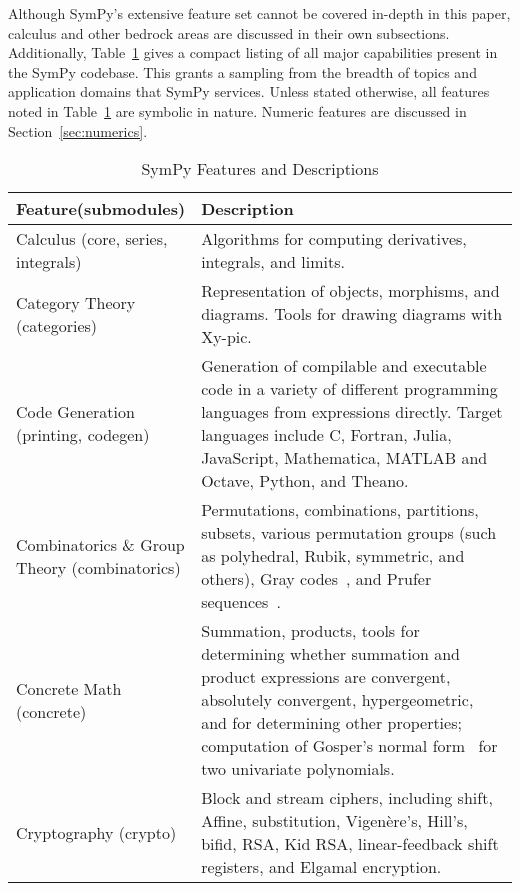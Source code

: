 
Although SymPy's extensive feature set cannot be covered in-depth in this paper,
calculus and other bedrock areas are discussed in their own subsections.
Additionally,
Table~\ref{features-table} gives a compact listing of all major capabilities
present in the SymPy codebase. This grants a sampling from the breadth of
topics and application domains that SymPy services. Unless stated otherwise,
all features noted in Table~\ref{features-table} are symbolic in nature.
Numeric features are discussed in Section~\ref{sec:numerics}.

\begin{longtable}[htbc]{p{0.3\linewidth}p{0.7\linewidth}}
\caption{SymPy Features and Descriptions\label{features-table}}\\
\toprule
\textbf{Feature(submodules)} & \textbf{Description} \\
\midrule
Calculus (core, series, integrals) & Algorithms for computing derivatives, integrals, and limits.\\

Category Theory (categories) & Representation of objects, morphisms, and diagrams. Tools
for drawing diagrams with Xy-pic.\\

Code Generation (printing, codegen) & Generation of compilable and executable code in a
variety of different programming languages from expressions directly. Target
languages include C, Fortran, Julia, JavaScript,
Mathematica, MATLAB and Octave, Python, and Theano.\\

Combinatorics \& Group Theory (combinatorics) & Permutations, combinations,
partitions, subsets, various permutation groups (such as polyhedral, Rubik,
symmetric, and others), Gray codes~\cite{Nijenhuis1978combinatorial},
and Prufer sequences~\cite{biggs1976graph}.\\

Concrete Math (concrete) & Summation, products, tools for determining whether summation
and product expressions are convergent, absolutely convergent, hypergeometric,
and for determining other properties; computation of Gosper's normal form~\cite{petkovvsek1996bak} for two univariate polynomials.\\

Cryptography (crypto) & Block and stream ciphers, including shift, Affine,
substitution, Vigen\`{e}re's, Hill's, bifid, RSA, Kid RSA,
linear-feedback shift registers, and Elgamal encryption.\\


\end{longtable}
